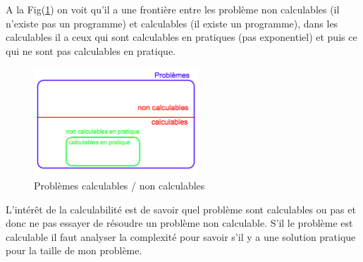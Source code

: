 A la Fig(\ref{cal_non_cal}) on voit qu'il a une frontière entre les problème non calculables (il n'existe pas un programme) et calculables (il existe un programme),  dans les calculables il a ceux qui sont calculables en pratiques (pas exponentiel) et puis ce qui ne sont pas calculables en pratique. 

\begin{figure}[h]
  \centering
  \includegraphics[width=0.55\textwidth]{Images/Problemes_calculables_et_non_calculables.png}
  \caption{ Problèmes calculables / non calculables }
  \label{cal_non_cal}
\end{figure}

L'intérêt de la calculabilité est de savoir quel problème sont calculables ou pas et donc ne pas essayer de résoudre un problème non calculable. S'il le problème est calculable il faut analyser la complexité pour savoir s'il y a une solution pratique pour la taille de mon problème. 



